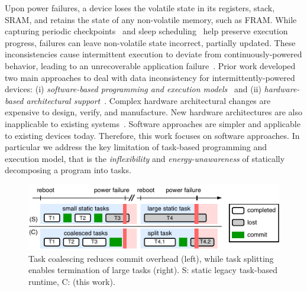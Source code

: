 Upon power failures, a device loses the volatile state in its registers, stack, SRAM, and retains the state of any non-volatile memory, such as FRAM. While capturing periodic checkpoints~\cite{mementos,quickrecall} and sleep scheduling~\cite{dewdrop,hibernus,hibernusplusplus} help preserve execution progress, failures can leave non-volatile state incorrect, partially updated. These inconsistencies cause intermittent execution to deviate from continuously-powered behavior, leading to an unrecoverable application failure~\cite{dino,edb}. Prior work developed two main approaches to deal with data inconsistency for intermittently-powered devices: (i) \emph{software-based programming and execution models}~\cite{dino,ratchet,chain,alpaca} and (ii) \emph{hardware-based architectural support}~\cite{hicks_isca_2017,idetic,nvp}. Complex hardware architectural changes are expensive to design, verify, and manufacture. New hardware architectures are also inapplicable to existing systems~\cite{hicks_isca_2017,nvp}. Software approaches are simpler and applicable to existing devices today. Therefore, this work focuses on software approaches. In particular we address the key limitation of task-based programming and execution model, that is the {\em inflexibility} and \emph{energy-unawareness} of statically decomposing a program into tasks.
%
\begin{figure}
    \centering
    \includegraphics[width=0.8\columnwidth]{figures/intro-figure-v5.pdf}
    \caption{Task coalescing reduces commit overhead (left), while task splitting enables termination of large tasks (right).
    S: static legacy task-based runtime, C: \sys (this work).}
    \label{fig:coalesce}
\end{figure}


